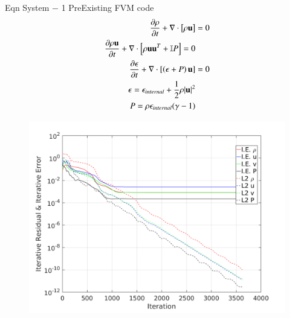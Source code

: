 \begin{frame}[t]{Eqn System $-$ 1 PreExisting FVM code}
  \minipage{\textwidth}
  \begin{align*}
    \frac{\partial \rho}{\partial t} + \nabla \cdot \left[\rho \mathbf{u}\right] &= 0 \\
    \frac{\partial \rho \mathbf{u}}{\partial t} + \nabla \cdot \left[\rho \mathbf{u}\mathbf{u}^T + \mathbb{I}P\right] = 0 \\
    \frac{\partial \epsilon}{\partial t} + \nabla \cdot \left[\left(\epsilon + P \right)\mathbf{u}\right] &= 0 \\
    \epsilon = \epsilon_{internal} + \frac{1}{2}\rho|\mathbf{u}|^2 &\\
    P = \rho \epsilon_{internal} (\gamma - 1) &
  \end{align*}
  \endminipage\hfill
 \begin{figure}[!htbp]
   \includegraphics[width=1.0\linewidth]{fig/Iter_SB}
   \centering
 \end{figure}

  \endminipage\hfill
  \endminipage

\end{frame}

